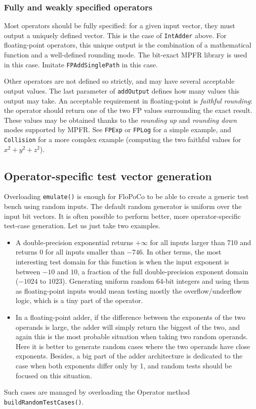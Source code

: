 \documentclass{article}
\begin{document}
\subsubsection{Fully and weakly specified operators}
 Most operators should be fully specified: for a given input
  vector, they must output a uniquely defined vector. This is the case of 
  \texttt{\small IntAdder} above. For floating-point
  operators, this unique output is the combination of a mathematical
  function and a well-defined rounding mode. The bit-exact MPFR
  library is used in this case. Imitate \texttt{\small FPAddSinglePath} in this case.

 Other operators are not defined so strictly, and may have
  several acceptable output values. The last parameter of \texttt{\small addOutput}
  defines how many values this output may take. An acceptable
  requirement in floating-point is \emph{faithful rounding}: the
  operator should return one of the two FP values surrounding the
  exact result. These values may be obtained thanks to the
  \emph{rounding up} and \emph{rounding down} modes supported by
  MPFR. See \texttt{\small FPExp} or \texttt{\small FPLog} for a simple example, and
  \texttt{\small Collision} for a more complex example (computing the two
  faithful values for $x^2+y^2+z^2$).


\subsection{Operator-specific test  vector generation}
Overloading \texttt{\small emulate()} is enough for FloPoCo to be able
to create a generic test bench using random inputs. The default random generator is uniform over the input bit vectors. It is
often possible to perform better, more operator-specific test-case
generation. Let us just take two examples.

\begin{itemize}\item 
  A double-precision exponential returns $+\infty$ for all inputs
  larger than 710 and returns $0$ for all inputs smaller than
  $-746$. In other terms, the most interesting test domain for this
  function is when the input exponent is between $-10$ and $10$, a
  fraction of the full double-precision exponent domain ($-1024$ to
  $1023$). Generating uniform random 64-bit integers and using them as
  floating-point inputs would mean testing mostly the
  overflow/underflow logic, which is a tiny part of the operator.


\item In a floating-point adder, if the difference between the
  exponents of the two operands is large, the adder will simply return
  the biggest of the two, and again this is the most probable
  situation when taking two random operands. Here it is better to
  generate random cases where the two operands have close
  exponents. Besides, a big part of the adder architecture is
  dedicated to the case when both exponents differ only by 1, and
  random tests should be focused on this situation.
\end{itemize}
  Such cases are managed by overloading the Operator method
  \texttt{\small buildRandomTestCases()}. 
\end{document}

